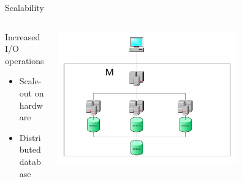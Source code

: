 \begin{frame}{Scalability}{}
  \begin{columns}[T]
    \begin{column}{.5\textwidth}
     \begin{block}{Increased I/O operations}
  \begin{itemize}
    \item Scale-out on hardware
    \item Distributed database
  \end{itemize}
\end{block}
\end{column}
    \begin{column}{.5\textwidth}
    \begin{block}{}
    \begin{center}
    \includegraphics[width=0.7\textwidth]{images/master_scaling.pdf}
    \end{center}
    \end{block}
    \end{column}
    \end{columns}
\end{frame}




